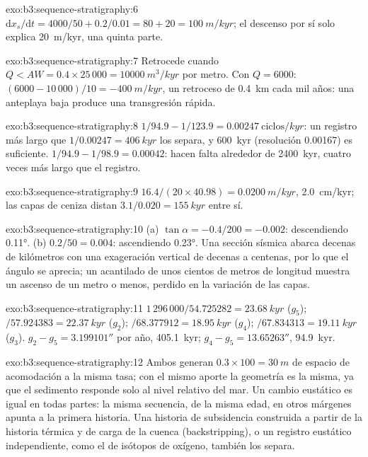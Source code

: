\begin{solution}{exo:b3:sequence-stratigraphy:6}
$\mathrm dx_s/\mathrm dt = 4000/50 + 0.2/0.01 = 80 + 20 = \qty{100}{m/kyr}$;
el descenso por sí solo explica \qty{20}{m/kyr}, una quinta parte.
\end{solution}

\begin{solution}{exo:b3:sequence-stratigraphy:7}
Retrocede cuando $Q < AW = 0.4\times25\,000 = \qty{10000}{m^3/kyr}$ por
metro. Con $Q = 6000$: $(6000 - 10\,000)/10 = \qty{-400}{m/kyr}$, un retroceso
de \qty{0.4}{km} cada mil años: una anteplaya baja produce una
transgresión rápida.
\end{solution}

\begin{solution}{exo:b3:sequence-stratigraphy:8}
$1/94.9 - 1/123.9 = \qty{0.00247}{\text{ciclos}/kyr}$: un registro más largo que
$1/0.00247 = \qty{406}{kyr}$ los separa, y \qty{600}{kyr} (resolución
0.00167) es suficiente. $1/94.9 - 1/98.9 = 0.00042$: hacen falta alrededor de
\qty{2400}{kyr}, cuatro veces más largo que el registro.
\end{solution}

\begin{solution}{exo:b3:sequence-stratigraphy:9}
$16.4/(20\times40.98) = \qty{0.0200}{m/kyr}$, \qty{2.0}{cm/kyr}; las capas de ceniza
distan $3.1/0.020 = \qty{155}{kyr}$ entre sí.
\end{solution}

\begin{solution}{exo:b3:sequence-stratigraphy:10}
(a) $\tan\alpha = -0.4/200 = -0.002$: descendiendo \ang{0.11}. (b)
$0.2/50 = 0.004$: ascendiendo \ang{0.23}. Una sección sísmica abarca decenas de
kilómetros con una exageración vertical de decenas a centenas, por lo que el ángulo se aprecia;
un acantilado de unos cientos de metros de longitud muestra un ascenso de un metro o menos, perdido en
la variación de las capas.
\end{solution}

\begin{solution}{exo:b3:sequence-stratigraphy:11}
$1\,296\,000/54.725282 = \qty{23.68}{kyr}$ ($g_5$); $/57.924383 =
\qty{22.37}{kyr}$ ($g_2$); $/68.377912 = \qty{18.95}{kyr}$ ($g_4$);
$/67.834313 = \qty{19.11}{kyr}$ ($g_3$). $g_2 - g_5 = 3.199101''$ por año,
\qty{405.1}{kyr}; $g_4 - g_5 = 13.65263''$, \qty{94.9}{kyr}.
\end{solution}

\begin{solution}{exo:b3:sequence-stratigraphy:12}
Ambos generan $0.3\times100 = \qty{30}{m}$ de espacio de acomodación a la misma tasa; con
el mismo aporte la geometría es la misma, ya que el sedimento responde solo al
nivel relativo del mar. Un cambio eustático es igual en todas partes: la misma
secuencia, de la misma edad, en otros márgenes apunta a la primera historia. Una
historia de subsidencia construida a partir de la historia térmica y de carga de la cuenca
(backstripping), o un registro eustático independiente, como el de isótopos de oxígeno,
también los separa.
\end{solution}


